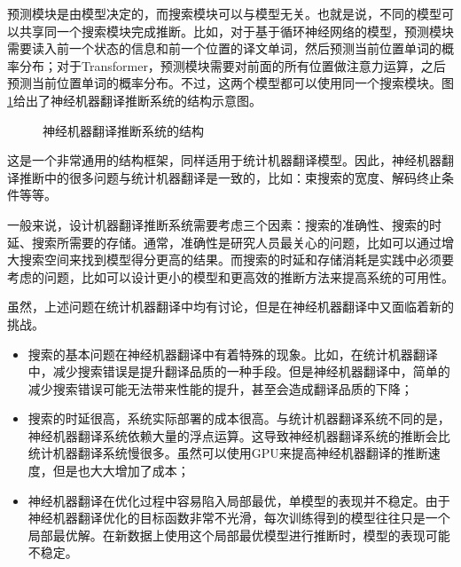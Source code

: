 \parinterval 预测模块是由模型决定的，而搜索模块可以与模型无关。也就是说，不同的模型可以共享同一个搜索模块完成推断。比如，对于基于循环神经网络的模型，预测模块需要读入前一个状态的信息和前一个位置的译文单词，然后预测当前位置单词的概率分布；对于Transformer，预测模块需要对前面的所有位置做注意力运算，之后预测当前位置单词的概率分布。不过，这两个模型都可以使用同一个搜索模块。图\ref{fig:14-1}给出了神经机器翻译推断系统的结构示意图。

\begin{figure}[htp]
\centering

\caption{神经机器翻译推断系统的结构}
\label{fig:14-1}
\end{figure}

\parinterval 这是一个非常通用的结构框架，同样适用于统计机器翻译模型。因此，神经机器翻译推断中的很多问题与统计机器翻译是一致的，比如：束搜索的宽度、解码终止条件等等。

\parinterval 一般来说，设计机器翻译推断系统需要考虑三个因素：搜索的准确性、搜索的时延、搜索所需要的存储。通常，准确性是研究人员最关心的问题，比如可以通过增大搜索空间来找到模型得分更高的结果。而搜索的时延和存储消耗是实践中必须要考虑的问题，比如可以设计更小的模型和更高效的推断方法来提高系统的可用性。

\parinterval 虽然，上述问题在统计机器翻译中均有讨论，但是在神经机器翻译中又面临着新的挑战。

\begin{itemize}
\vspace{0.5em}
\item 搜索的基本问题在神经机器翻译中有着特殊的现象。比如，在统计机器翻译中，减少搜索错误是提升翻译品质的一种手段。但是神经机器翻译中，简单的减少搜索错误可能无法带来性能的提升，甚至会造成翻译品质的下降；
\vspace{0.5em}
\item 搜索的时延很高，系统实际部署的成本很高。与统计机器翻译系统不同的是，神经机器翻译系统依赖大量的浮点运算。这导致神经机器翻译系统的推断会比统计机器翻译系统慢很多。虽然可以使用GPU来提高神经机器翻译的推断速度，但是也大大增加了成本；
\vspace{0.5em}
\item 神经机器翻译在优化过程中容易陷入局部最优，单模型的表现并不稳定。由于神经机器翻译优化的目标函数非常不光滑，每次训练得到的模型往往只是一个局部最优解。在新数据上使用这个局部最优模型进行推断时，模型的表现可能不稳定。
\vspace{0.5em}
\end{itemize}

